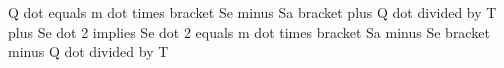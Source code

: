 Q dot equals m dot times bracket Se minus Sa bracket plus Q dot divided by T plus Se dot 2  
implies Se dot 2 equals m dot times bracket Sa minus Se bracket minus Q dot divided by T